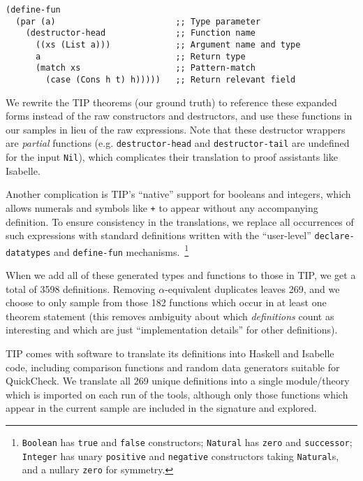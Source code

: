 \begin{samepage}
\begin{verbatim}
(define-fun
  (par (a)                        ;; Type parameter
    (destructor-head              ;; Function name
      ((xs (List a)))             ;; Argument name and type
      a                           ;; Return type
      (match xs                   ;; Pattern-match
        (case (Cons h t) h)))))   ;; Return relevant field
\end{verbatim}
\end{samepage}

\begin{sloppypar}
  We rewrite the TIP theorems (our ground truth) to reference these expanded
  forms instead of the raw constructors and destructors, and use these functions
  in our samples in lieu of the raw expressions. Note that these destructor
  wrappers are \emph{partial} functions (e.g. \texttt{destructor-head} and
  \texttt{destructor-tail} are undefined for the input \texttt{Nil}), which
  complicates their translation to proof assistants like Isabelle.
\end{sloppypar}

Another complication is TIP's ``native'' support for booleans and integers,
which allows numerals and symbols like \texttt{+} to appear without any
accompanying definition. To ensure consistency in the translations, we replace
all occurrences of such expressions with standard definitions written with the
``user-level'' \texttt{declare-datatypes} and \texttt{define-fun}
mechanisms.~\footnote{\texttt{Boolean} has \texttt{true} and \texttt{false}
  constructors; \texttt{Natural} has \texttt{zero} and \texttt{successor};
  \texttt{Integer} has unary \texttt{positive} and \texttt{negative}
  constructors taking \texttt{Natural}s, and a nullary \texttt{zero} for
  symmetry.}

When we add all of these generated types and functions to those in TIP, we get a
total of 3598 definitions. Removing $\alpha$-equivalent duplicates leaves 269,
and we choose to only sample from those 182 functions which occur in at least
one theorem statement (this removes ambiguity about which \emph{definitions}
count as interesting and which are just ``implementation details'' for other
definitions).

TIP comes with software to translate its definitions into Haskell and Isabelle
code, including comparison functions and random data generators suitable for
QuickCheck. We translate all 269 unique definitions into a single module/theory
which is imported on each run of the tools, although only those functions which
appear in the current sample are included in the signature and explored.

